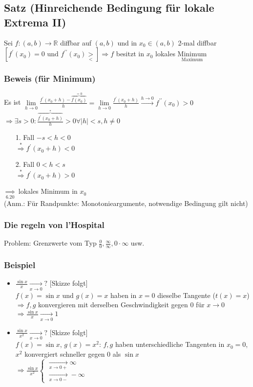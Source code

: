 \documentclass[12pt, titlepage]{article}
\newcommand{\R}{\mathds{R}}
\renewcommand{\>}{\rightarrow}
\renewcommand{\*}{\cdot}
\begin{document}
	\subsection{Satz (Hinreichende Bedingung für lokale Extrema II)}
	Sei $f\colon(a,b)\>\R$ diffbar auf $(a,b)$ und in $x_0\in(a,b)$ 2-mal diffbar\\
	$[f^\prime(x_0)=0\textrm{ und }f^{\prime\prime}(x_0)\underset{<}{>}]\Rightarrow f$ besitzt in $x_0$ lokales $\underset{\textrm{Maximum}}{\textrm{Minimum}}$
	\subsubsection*{Beweis (für Minimum)}
	Es ist $\lim\limits_{h\>0}\frac{f^\prime(x_0+h)-\overbrace{f(x_0)}^{=0}}{h}=\lim\limits_{h\>0}\frac{f^\prime(x_0+h)}{h}\overset{h\>0}{\>}f^{\prime\prime}(x_0)>0$\\
	$\Rightarrow \exists s>0\colon\frac{\overbrace{f^\prime(x_0+h)}^{*}}{h}>0\forall|h|<s,h\neq0$
	\begin{itemize}
		\item[1. Fall] $-s<h<0$\\
		$\overset{*}{\Rightarrow}f^\prime(x_0+h)<0$
		\item[2. Fall] $0<h<s$\\
		$\overset{*}{\Rightarrow}f^\prime(x_0+h)>0$
	\end{itemize}
	$\underset{\textrm{6.20}}{\Rightarrow}$ lokales Minimum in $x_0$\\
	(Anm.: Für Randpunkte: Monotonieargumente, notwendige Bedingung gilt nicht)
	\subsubsection*{Die regeln von l'Hospital}
	Problem: Grenzwerte vom Typ $\frac{0}{0},\frac{\infty}{\infty},0\*\infty$ usw.
	\subsubsection*{Beispiel}
	\begin{itemize}
		\item	$\frac{\sin x}{x}\underset{x\>0}{\>}?$ [Skizze folgt]\\
	$f(x)=\sin x$ und $g(x)=x$ haben in $x=0$ dieselbe Tangente ($t(x)=x$)\\
	$\Rightarrow f,g$ konvergieren mit derselben Geschwindigkeit gegen 0 für $x\>0$\\
	$\Rightarrow \frac{\sin x}{x}\underset{x\>0}{\>}1$
	\item $\frac{\sin x}{x^2}\underset{x\>0}{\>}?$ [Skizze folgt]\\
	$f(x)=\sin x$, $g(x)=x^2$: $f,g$ haben unterschiedliche Tangenten in $x_0=0$, $x^2$ konvergiert schneller gegen 0 als $\sin x$\\
	$\Rightarrow \frac{\sin x}{x^2}\begin{cases}
	\underset{x\>0+}{\>}\infty\\
	\underset{x\>0-}{\>}-\infty
	\end{cases}$
	\end{itemize}
\end{document}
